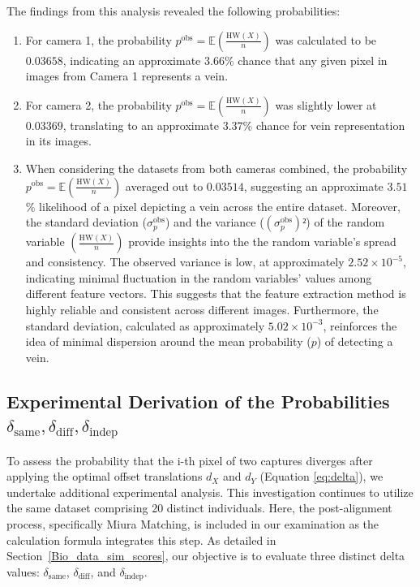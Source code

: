 The findings from this analysis revealed the following probabilities:
\begin{enumerate}
    \item For camera 1, the probability \(p^{\text{obs}} = \mathbb{E}\left( \frac{\text{HW}(X)}{n} \right)\) was calculated to be \(0.03658\), indicating an approximate \(3.66\)\% chance that any given pixel in images from Camera 1 represents a vein.

    \item For camera 2, the probability \(p^{\text{obs}} = \mathbb{E}\left( \frac{\text{HW}(X)}{n} \right)\) was slightly lower at \(0.03369\), translating to an approximate \(3.37\)\% chance for vein representation in its images.

    \item When considering the datasets from both cameras combined, the probability \(p^{\text{obs}} = \mathbb{E}\left( \frac{\text{HW}(X)}{n} \right)\) averaged out to \(0.03514\), suggesting an approximate \(3.51\)\% likelihood of a pixel depicting a vein across the entire dataset. Moreover, the standard deviation (\( \sigma^{\text{obs}}_p \)) and the variance (\((\sigma^{\text{obs}}_p)²\)) of the random variable \(\left( \frac{\text{HW}(X)}{n} \right)\) provide insights into the the random variable's spread and consistency. The observed variance is low, at approximately \( 2.52 \times 10^{-5} \), indicating minimal fluctuation in the random variables' values among different feature vectors. This suggests that the feature extraction method is highly reliable and consistent across different images. Furthermore, the standard deviation, calculated as approximately \( 5.02 \times 10^{-3} \), reinforces the idea of minimal dispersion around the mean probability (\(p\)) of detecting a vein. 
    
\end{enumerate}

\subsection{Experimental Derivation of the Probabilities \(\delta_{\text{same}}, \delta_{\text{diff}}, \delta_{\text{indep}}\)}
\label{sec:delta}

To assess the probability that the i-th pixel of two captures diverges after applying the optimal offset translations \( d_X \) and \( d_Y \) (Equation \ref{eq:delta}), we undertake additional experimental analysis. This investigation continues to utilize the same dataset comprising 20 distinct individuals. Here, the post-alignment process, specifically Miura Matching, is included in our examination as the calculation formula integrates this step. As detailed in Section~\ref{Bio_data_sim_scores}, our objective is to evaluate three distinct delta values: \(\delta_{\text{same}}\), \(\delta_{\text{diff}}\), and  \(\delta_{\text{indep}}\).


